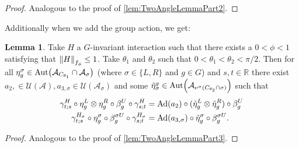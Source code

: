 \documentclass[12pt,a4paper,twoside]{article}
\let\originalleft\left
\let\originalright\right
\renewcommand{\left}{\mathopen{}\mathclose\bgroup\originalleft}
\renewcommand{\right}{\aftergroup\egroup\originalright}
\newcommand{\UU}{\mathcal U}
\renewcommand{\AA}{\mathcal A}
\newcommand{\RR}{\mathbb R}
\newcommand{\Ad}[1]{\textrm{Ad}\left(#1\right)}
\newcommand{\Aut}[1]{\textrm{Aut}\left(#1\right)}
\theoremstyle{definition}
\newtheorem{lemma}[theorem]{Lemma}
\numberwithin{equation}{section}
\begin{document}
\begin{proof}
	Analogous to the proof of \ref{lem:TwoAngleLemmaPart2}.
\end{proof}
Additionally when we add the group action, we get:
\begin{lemma}\label{lem:TwoAngleLemmaPart3ForTwoTranlations}
	Take $H$ a $G$-invariant interaction such that there exists a $0<\phi<1$ satisfying that $\norm{H}_{f_\phi}\leq 1$. Take $\theta_1$ and $\theta_2$ such that $0<\theta_1<\theta_2<\pi/2$. Then for all $\eta_{g}^{\sigma}\in\Aut{\AA_{C_{\theta_1}}\cap\AA_{\sigma}}$ (where $\sigma\in\{L,R\}$ and $g\in G$) and $s,t\in\RR$ there exist $a_{2},\in\UU(\AA),a_{3,\sigma}\in\UU(\AA_\sigma)$ and some $\tilde{\eta}_{\sigma}^g\in \Aut{\AA_{\nu^\sigma(C_{\theta_2}\cap\sigma)}}$ such that
	\begin{align}
		\label{eq:TwoAngleLemmaPart3Equation1ForTwoTranlations}
		\gamma^{H}_{t;s}\circ\eta_{g}^L\otimes\eta_{g}^R\circ\beta_g^U\circ\gamma^{H}_{s;t}&=\Ad{a_2}\circ(\tilde\eta_{g}^L \otimes\tilde\eta_{g}^R)\circ\beta_g^U\\
		\label{eq:TwoAngleLemmaPart3Equation2ForTwoTranlations}
		\gamma^{H_\sigma}_{t;s}\circ\eta_g^\sigma\circ\beta_g^{\sigma U}\circ\gamma^{H_\sigma}_{s;t}&=\Ad{a_{3,\sigma}}\circ \tilde\eta_{g}^\sigma\circ\beta_g^{\sigma U}.
	\end{align}
\end{lemma}
\begin{proof}
	Analogous to the proof of \ref{lem:TwoAngleLemmaPart3}.
\end{proof}
\clearpage


\end{document}
